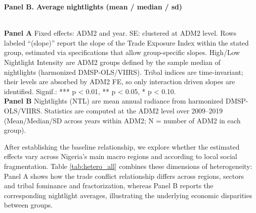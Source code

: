 \begin{table}[htbp]
	\vspace{4pt}
	\textbf{Panel B. Average nightlights (mean / median / sd)}\\[2pt]
	\tiny
	\vspace{3pt}
	\\[2pt]
	\begin{minipage}{0.95\textwidth}
		\footnotesize \textbf{Panel A} Fixed effects: ADM2 and year. SE: clustered at ADM2 level. Rows labeled “(slope)” report the slope of the Trade Exposure Index within the stated group, estimated via specifications that allow group-specific slopes. High/Low Nightlight Intensity are ADM2 groups defined by the sample median of nightlights (harmonized DMSP-OLS/VIIRS). Tribal indices are time-invariant; their levels are absorbed by ADM2 FE, so only interaction driven slopes are identified. Signif.: *** p < 0.01, ** p < 0.05, * p < 0.10. \\
		\textbf{Panel B} Nightlights (NTL) are mean annual radiance from harmonized DMSP-OLS/VIIRS. Statistics are computed at the ADM2 level over 2009–2019 (Mean/Median/SD across years within ADM2; N = number of ADM2 in each group).\\
	\end{minipage}
\end{table}


After establishing the baseline relationship, we explore whether the estimated effects vary across Nigeria’s main macro regions and according to local social fragmentation. Table \ref{tab:hetero_all} combines these dimensions of heterogeneity: Panel A shows how the trade conflict relationship differs across regions, sectors and tribal fominance and fractorization, whereas Panel B reports the corresponding nightlight averages, illustrating the underlying economic disparities between groups.\\


